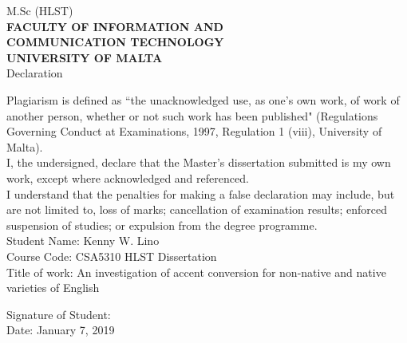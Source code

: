 \cleardoublepage

\begin{center}
  M.Sc (HLST) \\
  \uppercase{\textbf{Faculty of Information and \\
  Communication Technology \\ University of Malta \\ }}
  \vspace*{0.5cm}
  Declaration \\
\end{center}
  \vspace*{1.5cm}
        Plagiarism is defined as ``the unacknowledged use, as one's own work, of work of another person, whether or not such work has been published" (Regulations Governing Conduct at Examinations, 1997, Regulation 1 (viii), University of Malta). \\

I, the undersigned, declare that the Master's dissertation submitted is my own work, except where acknowledged and referenced. \\

I understand that the penalties for making a false declaration may include, but are not limited to, loss of marks; cancellation of examination results; enforced suspension of studies; or expulsion from the degree programme. \\
       
       \vspace*{1.5cm}
	     Student Name: Kenny W. Lino \\
       Course Code: CSA5310 HLST Dissertation \\
       Title of work: An investigation of accent conversion for non-native and native varieties of English\

       \vspace*{1.0cm}
       Signature of Student: \\

       \vspace*{1.0cm}
       Date: January 7, 2019

\newpage

